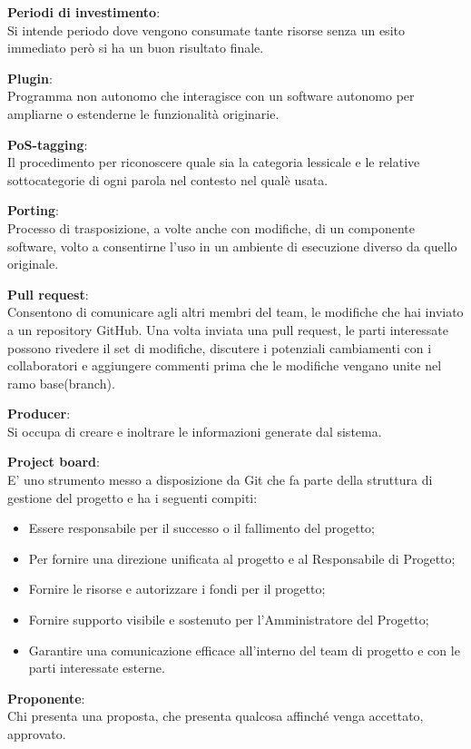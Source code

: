\documentclass[a4paper, oneside, openany, dvipsnames, table]{article}
\begin{document}
\textbf{Periodi di investimento}:\\	Si intende periodo dove vengono consumate tante risorse senza un esito immediato però si ha un buon risultato finale.

\textbf{Plugin}:\\	Programma non autonomo che interagisce con un software autonomo per ampliarne o estenderne le funzionalità originarie.

\textbf{PoS-tagging}:\\	Il procedimento per riconoscere quale sia la categoria lessicale e le relative sottocategorie di ogni parola nel contesto nel qualè usata.

\textbf{Porting}:\\	Processo di trasposizione, a volte anche con modifiche, di un componente software, volto a consentirne l'uso in un ambiente di esecuzione diverso da quello originale.

\textbf{Pull request}:\\	Consentono di comunicare agli altri membri del team, le modifiche che hai inviato a un repository GitHub. Una volta inviata una pull request, le parti interessate possono rivedere il set di modifiche, discutere i potenziali cambiamenti con i collaboratori e aggiungere commenti prima che le modifiche vengano unite nel ramo base(branch).

\textbf{Producer}:\\	Si occupa di creare e inoltrare le informazioni generate dal sistema.

\textbf{Project board}:\\	E' uno strumento messo a disposizione da Git che fa parte della struttura di gestione del progetto e ha i seguenti compiti:
\begin{itemize}
\item Essere responsabile per il successo o il fallimento del progetto;
\item Per fornire una direzione unificata al progetto e al Responsabile di Progetto;
\item Fornire le risorse e autorizzare i fondi per il progetto;
\item Fornire supporto visibile e sostenuto per l'Amministratore del Progetto;
\item Garantire una comunicazione efficace all'interno del team di progetto e con le parti interessate esterne.
\end{itemize}
\textbf{Proponente}:\\	Chi presenta una proposta, che presenta qualcosa affinché venga accettato, approvato.
\end{document}
